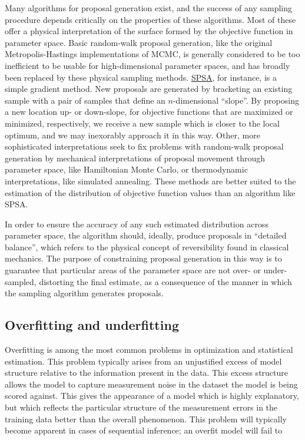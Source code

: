 Many algorithms for proposal generation exist, and the success of any sampling procedure depends critically on the properties of these algorithms. Most of these offer a physical interpretation of the surface formed by the objective function in parameter space. Basic random-walk proposal generation, like the original Metropolis-Hastings implementations of MCMC, is generally considered to be too inefficient to be usable for high-dimensional parameter spaces, and has broadly been replaced by these physical sampling methods. \hyperref[SPSA]{SPSA}, for instance, is a simple gradient method. New proposals are generated by bracketing an existing sample with a pair of samples that define an $n$-dimensional ``slope''. By proposing a new location up- or down-slope, for objective functions that are maximized or minimized, respectively, we receive a new sample which is closer to the local optimum, and we may inexorably approach it in this way. Other, more sophisticated interpretations seek to fix problems with random-walk proposal generation by mechanical interpretations of proposal movement through parameter space, like Hamiltonian Monte Carlo, or thermodynamic interpretations, like simulated annealing. These methods are better suited to the estimation of the distribution of objective function values than an algorithm like SPSA.

In order to ensure the accuracy of any such estimated distribution across parameter space, the algorithm should, ideally, produce proposals in ``detailed balance'', which refers to the physical concept of reversibility found in classical mechanics. The purpose of constraining proposal generation in this way is to guarantee that particular areas of the parameter space are not over- or under-sampled, distorting the final estimate, as a consequence of the manner in which the sampling algorithm generates proposals.

\subsection{Overfitting and underfitting}
\label{ssec:overfit}
Overfitting is among the most common problems in optimization and statistical estimation. This problem typically arises from an unjustified excess of model structure relative to the information present in the data. This excess structure allows the model to capture measurement noise in the dataset the model is being scored against. This gives the appearance of a model which is highly explanatory, but which reflects the particular structure of the measurement errors in the training data better than the overall phenomenon. This problem will typically become apparent in cases of sequential inference; an overfit model will fail to 

